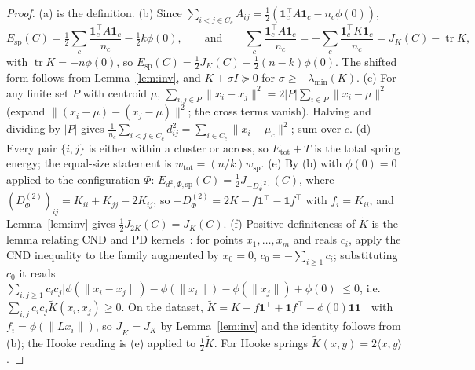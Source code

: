 \documentclass[11pt,a4paper]{article}
\theoremstyle{plain}
\theoremstyle{definition}
\theoremstyle{remark}
\newcommand{\tr}{\operatorname{tr}}
\newcommand{\spec}{\mathrm{sp}}
\newcommand{\tot}{\mathrm{tot}}
\newcommand{\one}{\mathbf 1}
\begin{document}
\begin{proof}
(a) is the definition. (b) Since $\sum_{i<j\in C_c}A_{ij}=\tfrac12(\one_c^{\!\top}A\one_c-n_c\phi(0))$,
\[
E_\spec(C)=\tfrac12\sum_c\frac{\one_c^{\!\top}A\one_c}{n_c}-\tfrac12 k\phi(0),
\qquad\text{and}\qquad
\sum_c\frac{\one_c^{\!\top}A\one_c}{n_c}=-\sum_c\frac{\one_c^{\!\top}K\one_c}{n_c}=J_K(C)-\tr K,
\]
with $\tr K=-n\phi(0)$, so $E_\spec(C)=\tfrac12J_K(C)+\tfrac12(n-k)\phi(0)$. The shifted form follows from Lemma~\ref{lem:inv}, and $K+\sigma I\succeq0$ for $\sigma\ge-\lambda_{\min}(K)$. (c) For any finite set $P$ with centroid $\mu$, $\sum_{i,j\in P}\lVert x_i-x_j\rVert^2=2|P|\sum_{i\in P}\lVert x_i-\mu\rVert^2$ (expand $\lVert(x_i-\mu)-(x_j-\mu)\rVert^2$; the cross terms vanish). Halving and dividing by $|P|$ gives $\frac1{n_c}\sum_{i<j\in C_c}d_{ij}^2=\sum_{i\in C_c}\lVert x_i-\mu_c\rVert^2$; sum over $c$. (d) Every pair $\{i,j\}$ is either within a cluster or across, so $E_\tot+T$ is the total spring energy; the equal-size statement is $w_\tot=(n/k)w_\spec$. (e) By (b) with $\phi(0)=0$ applied to the configuration $\Phi$: $E_{d^2,\Phi,\spec}(C)=\tfrac12J_{-D_\Phi^{(2)}}(C)$, where $(D_\Phi^{(2)})_{ij}=K_{ii}+K_{jj}-2K_{ij}$, so $-D_\Phi^{(2)}=2K-f\one^{\!\top}-\one f^{\!\top}$ with $f_i=K_{ii}$, and Lemma~\ref{lem:inv} gives $\tfrac12J_{2K}(C)=J_K(C)$. (f) Positive definiteness of $\widetilde K$ is the lemma relating CND and PD kernels~\citep[Ch.~3, \S2, Lemma~2.1]{bcr1984}: for points $x_1,\dots,x_m$ and reals $c_i$, apply the CND inequality to the family augmented by $x_0=0$, $c_0=-\sum_{i\ge1}c_i$; substituting $c_0$ it reads $\sum_{i,j\ge1}c_ic_j\bigl[\phi(\lVert x_i-x_j\rVert)-\phi(\lVert x_i\rVert)-\phi(\lVert x_j\rVert)+\phi(0)\bigr]\le0$, i.e.\ $\sum_{i,j}c_ic_j\widetilde K(x_i,x_j)\ge0$. On the dataset, $\widetilde K=K+f\one^{\!\top}+\one f^{\!\top}-\phi(0)\one\one^{\!\top}$ with $f_i=\phi(\lVert Lx_i\rVert)$, so $J_{\widetilde K}=J_K$ by Lemma~\ref{lem:inv} and the identity follows from (b); the Hooke reading is (e) applied to $\tfrac12\widetilde K$. For Hooke springs $\widetilde K(x,y)=2\langle x,y\rangle$.
\end{proof}
\end{document}
